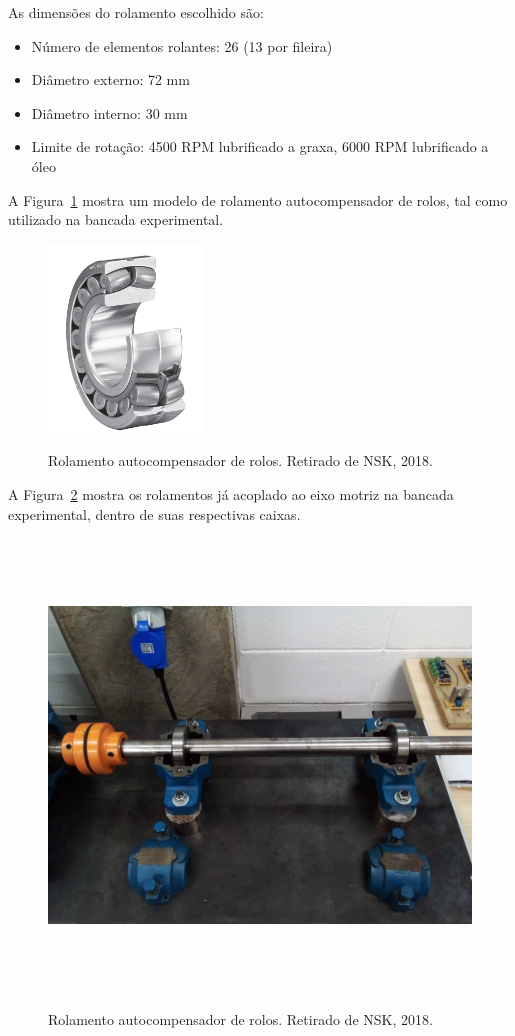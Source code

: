 \documentclass[
	12pt,				
	oneside,			
	a4paper,			
	english,			
	brazil,			
	]{abntex2ppgsi}
\begin{document}
As dimensões do rolamento escolhido são:

\begin{itemize}
	\item Número de elementos rolantes: 26 (13 por fileira)
	\item Diâmetro externo: 72 \si{\mm}
	\item Diâmetro interno: 30 \si{\mm}
	\item Limite de rotação: 4500 RPM lubrificado a graxa, 6000 RPM lubrificado a óleo
\end{itemize}

A Figura~\ref{Figura24} mostra um modelo de rolamento autocompensador de rolos, tal como utilizado na bancada experimental.

\begin{figure}[H]
\centering
\caption {Rolamento autocompensador de rolos. Retirado de NSK, 2018.}
\includegraphics[width=\textwidth,height=50mm,keepaspectratio]{Figura24}
\label{Figura24}
\end{figure} 

A Figura~\ref{rolamento_caixa_aberta} mostra os rolamentos já acoplado ao eixo motriz na bancada experimental, dentro de suas respectivas caixas.

\begin{figure}[H]
\centering
\caption {Rolamento autocompensador de rolos. Retirado de NSK, 2018.}
\includegraphics[width=\textwidth,height=120mm,keepaspectratio]{rolamento_caixa_aberta}
\label{rolamento_caixa_aberta}
\end{figure} 
\end{document}
